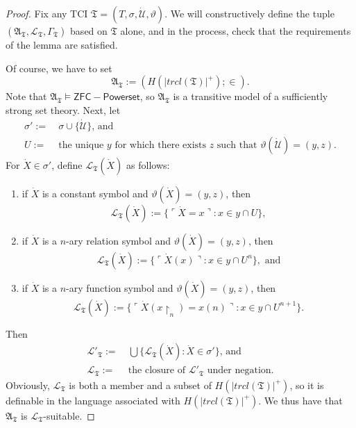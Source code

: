 \documentclass[12pt, twoside]{memoir}
\numberwithin{equation}{section}
\theoremstyle{definition}
\theoremstyle{remark}
\theoremstyle{definition}
\theoremstyle{definition}
\theoremstyle{definition}
\theoremstyle{remark}
\begin{document}
\begin{proof}
Fix any TCI $\mathfrak{T} = (T, \sigma, \dot{\mathcal{U}}, \vartheta)$. We will constructively define the tuple $(\mathfrak{A}_{\mathfrak{T}}, \mathcal{L}_{\mathfrak{T}}, \Gamma_{\mathfrak{T}})$ based on $\mathfrak{T}$ alone, and in the process, check that the requirements of the lemma are satisfied.

Of course, we have to set $$\mathfrak{A}_{\mathfrak{T}} := (H(|trcl(\mathfrak{T})|^+); \in).$$ Note that $\mathfrak{A}_{\mathfrak{T}} \models \mathsf{ZFC - Powerset}$, so $\mathfrak{A}_{\mathfrak{T}}$ is a transitive model of a sufficiently strong set theory. Next, let
\begin{align*}
    \sigma' := \ & \sigma \cup \{\dot{\mathcal{U}}\} \text{, and} \\
    U := \ & \text{the unique } y \text{ for which there exists } z \text{ such that } \vartheta(\dot{\mathcal{U}}) = (y, z).
\end{align*}
For $\dot{X} \in \sigma'$, define $\mathcal{L}_{\mathfrak{T}}(\dot{X})$ as follows:
\begin{enumerate}[label=(L\arabic*)]
    \item if $\dot{X}$ is a constant symbol and $\vartheta(\dot{X}) = (y, z)$, then $$\mathcal{L}_{\mathfrak{T}}(\dot{X}) := \{\ulcorner \dot{X} = x \urcorner : x \in y \cap U\},$$
    \item if $\dot{X}$ is a $n$-ary relation symbol and $\vartheta(\dot{X}) = (y, z)$, then $$\mathcal{L}_{\mathfrak{T}}(\dot{X}) := \{\ulcorner \dot{X}(x) \urcorner : x \in y \cap U^n\}, \text{ and}$$
    \item if $\dot{X}$ is a $n$-ary function symbol and $\vartheta(\dot{X}) = (y, z)$, then $$\mathcal{L}_{\mathfrak{T}}(\dot{X}) := \{\ulcorner \dot{X}(x \! \restriction_n) = x(n) \urcorner : x \in y \cap U^{n+1}\}.$$
\end{enumerate}
Then 
\begin{align*}
    \mathcal{L}'_{\mathfrak{T}} := \ & \bigcup \{\mathcal{L}_{\mathfrak{T}}(\dot{X}) : \dot{X} \in \sigma'\} \text{, and} \\
    \mathcal{L}_{\mathfrak{T}} := \ & \text{the closure of }  \mathcal{L}'_{\mathfrak{T}} \text{ under negation.}
\end{align*}
Obviously, $\mathcal{L}_{\mathfrak{T}}$ is both a member and a subset of $H(|trcl(\mathfrak{T})|^+)$, so it is definable in the language associated with $H(|trcl(\mathfrak{T})|^+)$. We thus have that $\mathfrak{A}_{\mathfrak{T}}$ is $\mathcal{L}_{\mathfrak{T}}$-suitable.


\end{proof}
\end{document}
